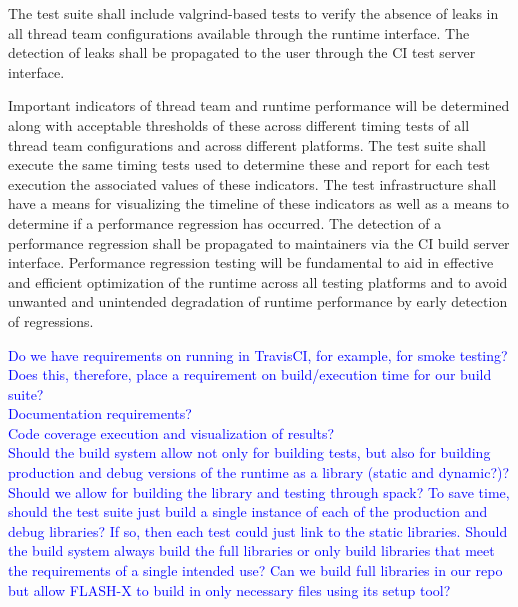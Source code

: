 \documentclass{article}
\newcommand{\FutureFlash}       {\textsf{FLASH}-X\xspace}
\begin{document}
\begin{req}
The test suite shall include valgrind-based tests to verify the absence of leaks
in all thread team configurations available through the runtime interface.  The
detection of leaks shall be propagated to the user through the CI test server
interface.
\end{req}

\begin{req}
Important indicators of thread team and runtime performance will be determined
along with acceptable thresholds of these across different timing tests of all
thread team configurations and across different platforms.  The test suite shall
execute the same timing tests used to determine these and report for each test
execution the associated values of these indicators.  The test infrastructure
shall have a means for visualizing the timeline of these indicators as well as a
means to determine if a performance regression has occurred.  The detection of a
performance regression shall be propagated to maintainers via the CI build
server interface.  Performance regression testing will be fundamental to aid in
effective and efficient optimization of the runtime across all testing platforms
and to avoid unwanted and unintended degradation of runtime performance by early
detection of regressions.
\end{req}

\textcolor{blue}{Do we have requirements on running in TravisCI, for example,
for smoke testing?  Does this, therefore, place a requirement on build/execution
time for our build suite?}\\

\textcolor{blue}{Documentation requirements?}\\

\textcolor{blue}{Code coverage execution and visualization of results?}\\

\textcolor{blue}{Should the build system allow not only for building tests, but
also for building production and debug versions of the runtime as a library
(static and dynamic?)?  Should we allow for building the library and testing
through spack?  To save time, should the test suite just build a single instance
of each of the production and debug libraries?  If so, then each test could just
link to the static libraries.  Should the build system always build the full
libraries or only build libraries that meet the requirements of a single
intended use?  Can we build full libraries in our repo but allow \FutureFlash to
build in only necessary files using its setup tool?}
\end{document}
